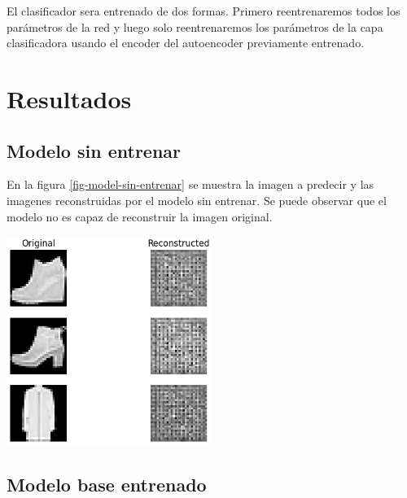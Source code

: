 \documentclass[aps,prl,reprint,groupedaddress]{revtex4-2}
\newenvironment{Figura}
  {\par\medskip\noindent\minipage{\linewidth}}
  {\endminipage\par\medskip}
\begin{document}
El clasificador sera entrenado de dos formas. Primero reentrenaremos todos los
parámetros de la red y luego solo reentrenaremos los parámetros de la capa
clasificadora usando el encoder del autoencoder previamente entrenado.

\section{Resultados}
\subsection{Modelo sin entrenar}

En la figura \ref{fig-model-sin-entrenar} se muestra la imagen a predecir y las
imagenes reconstruidas por el modelo sin entrenar. Se puede observar que el
modelo no es capaz de reconstruir la imagen original.

\begin{Figura}
  \centering
  \includegraphics[width=0.5\textwidth]{figs1/modelo_sin_entrenar.png}
  \label{fig-model-sin-entrenar}
\end{Figura}

\subsection{Modelo base entrenado}
\end{document}
